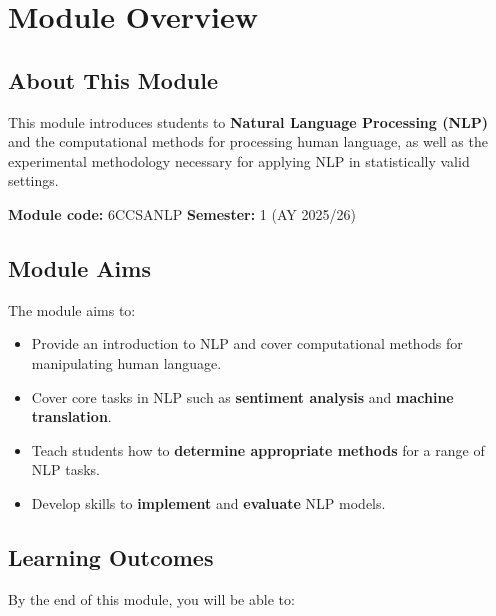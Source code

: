 \section*{Module Overview}

\subsection*{About This Module}

This module introduces students to \textbf{Natural Language Processing (NLP)} and the computational methods for processing human language, as well as the experimental methodology necessary for applying NLP in statistically valid settings.

\textbf{Module code:} 6CCSANLP \hfill \textbf{Semester:} 1 (AY 2025/26)

\bigseparator

\subsection*{Module Aims}

The module aims to:
\begin{itemize}
  \item Provide an introduction to NLP and cover computational methods for manipulating human language.
  \item Cover core tasks in NLP such as \textbf{sentiment analysis} and \textbf{machine translation}.
  \item Teach students how to \textbf{determine appropriate methods} for a range of NLP tasks.
  \item Develop skills to \textbf{implement} and \textbf{evaluate} NLP models.
\end{itemize}

\bigseparator

\subsection*{Learning Outcomes}

By the end of this module, you will be able to:

